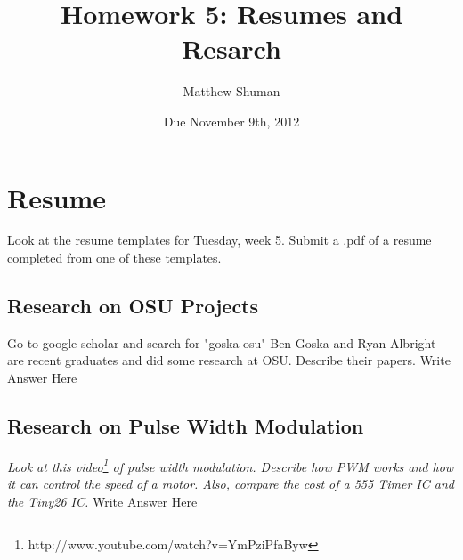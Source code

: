 \documentclass{article}
\title{Homework 5: Resumes and Resarch}
\author{Matthew Shuman}
\date{Due November 9th, 2012}
\begin{document}
\maketitle
{}

\section{Resume}
Look at the resume templates for Tuesday, week 5.  Submit a .pdf of a resume completed from one of these templates.\newline

\subsection{Research on OSU Projects}
Go to google scholar and search for "goska osu"  Ben Goska and Ryan Albright are recent graduates and did some research at OSU.  Describe their papers.\newline
Write Answer Here

\subsection{Research on Pulse Width Modulation}
\emph{Look at this video\footnote{http://www.youtube.com/watch?v=YmPziPfaByw} of pulse width modulation. Describe how PWM works and how it can control the speed of a motor. Also, compare the cost of a 555 Timer IC and the Tiny26 IC.}\newline
Write Answer Here
\end{document}
